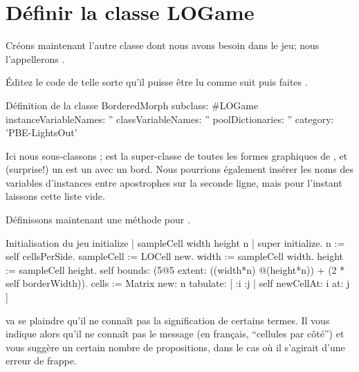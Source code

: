 \documentclass[a4paper,10pt,twoside]{book}
\begin{document}

\section{Définir la classe LOGame}

Créons maintenant l'autre classe dont nous avons besoin dans le jeu; nous l'appellerons .

Éditez le code de telle sorte qu'il puisse être lu comme suit puis faites .

\begin{classdef}[sbegame]{Définition de la classe }
BorderedMorph subclass: #LOGame
   instanceVariableNames: ''
   classVariableNames: ''
   poolDictionaries: ''
   category: 'PBE-LightsOut'
\end{classdef}

Ici nous sous-classons ;  est la
super-classe de toutes les formes graphiques de \pharo, et (surprise!)
un  est un  avec un bord.  
Nous pourrions également insérer les noms des variables d'instances
entre apostrophes sur la seconde ligne, mais pour l'instant 
laissons cette liste vide.

Définissons maintenant une méthode  pour .


\begin{numMethod}[sbegameinitialize]{Initialisation du jeu}
initialize
   | sampleCell width height n |
   super initialize.
   n := self cellsPerSide.
   sampleCell := LOCell new.
   width := sampleCell width.
   height := sampleCell height.
   self bounds: (5@5 extent: ((width*n) @(height*n)) + (2 * self borderWidth)).
   cells := Matrix new: n tabulate: [ :i :j | self newCellAt: i at: j ]
\end{numMethod}


\pharo va se plaindre qu'il ne connaît pas la signification de
certains termes.
Il vous indique alors qu'il ne connaît pas le message
 (en français, ``cellules par côté'') et
vous suggère un certain nombre de propositions, dans le cas où il
s'agirait d'une erreur de frappe.
\end{document}
